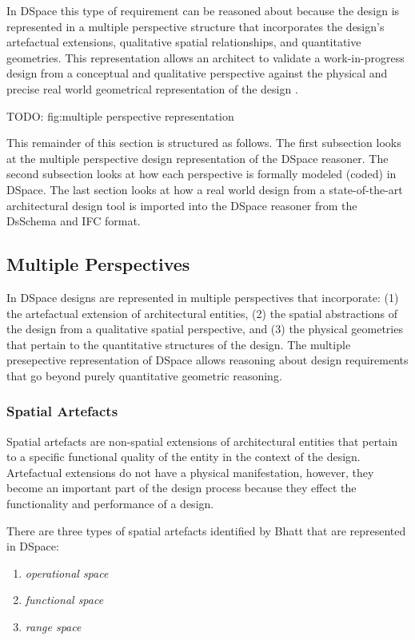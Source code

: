 \documentclass[12pt]{ucthesis}
\begin{document}
In DSpace this type of requirement can be reasoned about because the design is represented in a multiple perspective structure that incorporates the design's artefactual extensions, qualitative spatial relationships, and quantitative geometries. This representation allows an architect to validate a work-in-progress design from a conceptual and qualitative perspective against the physical and precise real world geometrical representation of the design \cite{Bhatt}.

TODO: fig:multiple perspective representation

This remainder of this section is structured as follows. The first subsection looks at the multiple perspective design representation of the DSpace reasoner. The second subsection looks at how each perspective is formally modeled (coded) in DSpace. The last section looks at how a real world design from a state-of-the-art architectural design tool is imported into the DSpace reasoner from the DsSchema and IFC format.

\subsection{Multiple Perspectives}
In DSpace designs are represented in multiple perspectives that incorporate: (1) the artefactual extension of architectural entities, (2) the spatial abstractions of the design from a qualitative spatial perspective, and (3) the physical geometries that pertain to the quantitative structures of the design. The multiple presepective representation of DSpace allows reasoning about design requirements that go beyond purely quantitative geometric reasoning.

\subsubsection{Spatial Artefacts}
Spatial artefacts are non-spatial extensions of architectural entities that pertain to a specific functional quality of the entity in the context of the design. Artefactual extensions do not have a physical manifestation, however, they become an important part of the design process because they effect the functionality and performance of a design. 

There are three types of spatial artefacts identified by Bhatt\cite{Bhatt} that are represented in DSpace:
\begin{enumerate}
\item \emph{operational space} 
\item \emph{functional space} 
\item \emph{range space} 
\end{enumerate}
\end{document}
